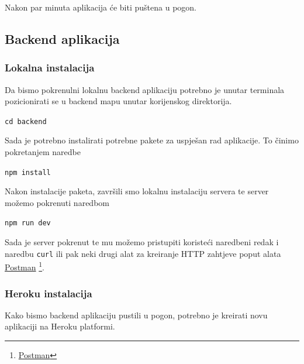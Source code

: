 								Nakon par minuta aplikacija će biti puštena u pogon.

						\pagebreak
						
						\subsection{Backend aplikacija}
	        
						\subsubsection*{Lokalna instalacija}
	        
	          		Da bismo pokrenulni lokalnu backend aplikaciju potrebno je unutar terminala pozicionirati se u backend mapu unutar korijenskog direktorija. 
	            
								\begin{center}
										\texttt{cd backend}
								\end{center}
								
								Sada je potrebno instalirati potrebne pakete za uspješan rad aplikacije. To činimo pokretanjem naredbe
								
								\begin{center}
										\texttt{npm install}
								\end{center}
								
								Nakon instalacije paketa, završili smo lokalnu instalaciju servera te server možemo pokrenuti naredbom
								
								\begin{center}
										\texttt{npm run dev}
								\end{center}
								
								Sada je server pokrenut te mu možemo pristupiti koristeći naredbeni redak i naredbu \texttt{curl} ili pak neki drugi alat za kreiranje HTTP zahtjeve poput alata \underline{Postman} \footnote{\href{https://www.postman.com/}{Postman}}.
		             
						\pagebreak
		    
						\subsubsection*{Heroku instalacija}
	        
								Kako bismo backend aplikaciju pustili u pogon, potrebno je kreirati novu aplikaciji na Heroku platformi.
								
